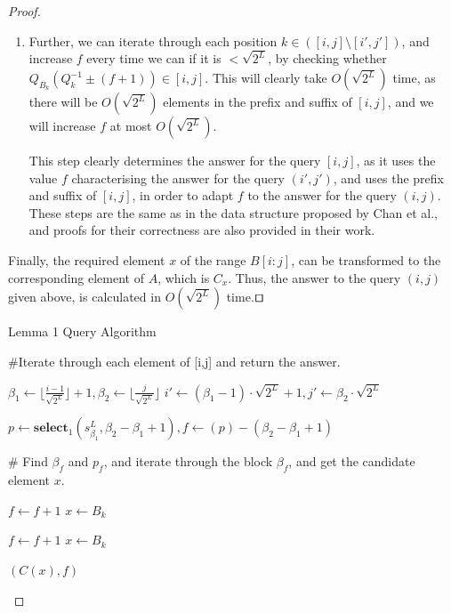 \documentclass[runningheads]{llncs}
\begin{document}
\begin{proof}
\begin{enumerate}
         \item Further, we can iterate through each position $k\in ([i,j]\setminus [i', j'])$, 
         and increase $f$ every time we can if it is $<\sqrt{2^L}$, by checking whether $Q_{B_k}(Q^{-1}_k \pm (f+1) ) \in [i,j]$. This will clearly take $O(\sqrt{2^L} )$ time, as there will be $O(\sqrt{2^L})$ elements in the prefix and suffix of $[i,j]$, and we will 
         increase $f$ at most $O(\sqrt{2^L})$. 

         This step clearly determines the answer for the query $[i,j]$, as it uses the value $f$ characterising the answer for the query $(i',j')$, and uses the prefix and suffix of $[i,j]$, in order to adapt $f$ 
         to the answer for the query $(i,j)$. These steps are the same as in the data structure proposed by Chan et al.\cite{chan2014linear}, and proofs for their correctness are also provided in their work. 

        \end{enumerate}
        
        Finally, the required element $x$ of the range $B[i:j]$, can be transformed to the corresponding element of $A$, which is $C_{ x }$. 
        Thus, the answer to the query $(i,j)$ given above, is calculated in $O(\sqrt{2^L})$ time.$\qed$ 



\begin{algorithm}[H]
    \caption{Lemma 1 Query Algorithm}\label{lemma1Query}
    \begin{algorithmic}[1]
    

    \State \#Iterate through each element of [i,j] and return the answer.
    
    \EndIf
    \State $\beta_1 \gets \lfloor \frac{i-1}{ \sqrt{2^L} } \rfloor +1, \beta_2 \gets \lfloor \frac{j}{\sqrt{2^L}} \rfloor$
    \State $i' \gets (\beta_1-1) \cdot \sqrt{2^L} + 1 , j' \gets \beta_2 \cdot \sqrt{2^L} $
    
    \State $p \gets \textbf{select}_1(s^L_{\beta_1}, \beta_2-\beta_1+1 ), f \gets (p)-(\beta_2-\beta_1+1) $
    
    \State \# Find $\beta_f$ and $p_f$, and iterate through the block $\beta_f$, and get the candidate element $x$.


            \State $f\gets f+1$
            \State $x\gets B_k$
        \EndWhile
    \EndFor

            \State $f\gets f+1$
            \State $x\gets B_k$
        \EndWhile
    \EndFor

    \Return $(C(x),f)$

    \EndFunction
    \end{algorithmic}
\end{algorithm}


\end{proof}
\end{document}
